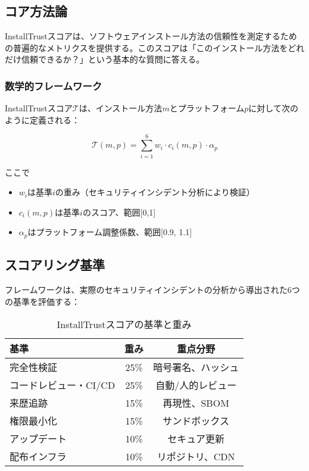 \documentclass[Specialissue]{jsaiart}
\begin{document}
\subsection{コア方法論}

InstallTrustスコアは、ソフトウェアインストール方法の信頼性を測定するための普遍的なメトリクスを提供する。このスコアは「このインストール方法をどれだけ信頼できるか？」という基本的な質問に答える。

\subsubsection{数学的フレームワーク}

InstallTrustスコア$\mathcal{T}$は、インストール方法$m$とプラットフォーム$p$に対して次のように定義される：

\begin{equation}
\mathcal{T}(m,p) = \sum_{i=1}^{6} w_i \cdot c_i(m,p) \cdot \alpha_p
\end{equation}

ここで
\begin{itemize}
    \item $w_i$は基準$i$の重み（セキュリティインシデント分析により検証）
    \item $c_i(m,p)$は基準$i$のスコア、範囲[0,1]
    \item $\alpha_p$はプラットフォーム調整係数、範囲[0.9, 1.1]
\end{itemize}

\subsection{スコアリング基準}

フレームワークは、実際のセキュリティインシデントの分析から導出された6つの基準を評価する：

\begin{table}[ht]
\centering
\caption{InstallTrustスコアの基準と重み}
\small
\begin{tabular}{p{4cm}cc}
\toprule
\rowcolor{headergray}
\textbf{基準} & \textbf{重み} & \textbf{重点分野} \\
\midrule
完全性検証 & 25\% & 暗号署名、ハッシュ \\
コードレビュー・CI/CD & 25\% & 自動/人的レビュー \\
来歴追跡 & 15\% & 再現性、SBOM \\
権限最小化 & 15\% & サンドボックス \\
アップデート & 10\% & セキュア更新 \\
配布インフラ & 10\% & リポジトリ、CDN \\
\bottomrule
\end{tabular}
\end{table}
\end{document}
